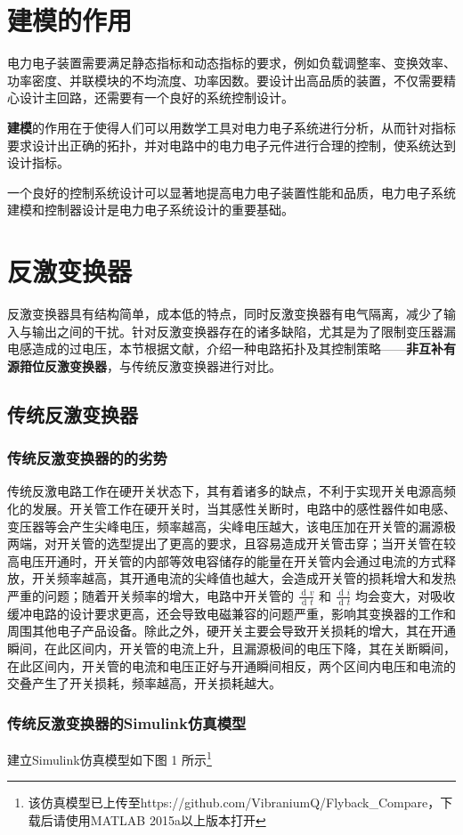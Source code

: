 \documentclass[UTF8]{ctexart}
\numberwithin{equation}{section}
\DeclareMathOperator{\dif}{d\!}
\begin{document}
	\section{建模的作用}
	电力电子装置需要满足静态指标和动态指标的要求，例如负载调整率、变换效率、功率密度、并联模块的不均流度、功率因数。要设计出高品质的装置，不仅需要精心设计主回路，还需要有一个良好的系统控制设计。
	
	\textbf{建模}的作用在于使得人们可以用数学工具对电力电子系统进行分析，从而针对指标要求设计出正确的拓扑，并对电路中的电力电子元件进行合理的控制，使系统达到设计指标。
	
	一个良好的控制系统设计可以显著地提高电力电子装置性能和品质，电力电子系统建模和控制器设计是电力电子系统设计的重要基础。
	\section{反激变换器}
	反激变换器具有结构简单，成本低的特点，同时反激变换器有电气隔离，减少了输入与输出之间的干扰。针对反激变换器存在的诸多缺陷，尤其是为了限制变压器漏电感造成的过电压，本节根据文献，介绍一种电路拓扑及其控制策略——\textbf{非互补有源箝位反激变换器}，与传统反激变换器进行对比。
	\subsection{传统反激变换器}
	\subsubsection{传统反激变换器的的劣势}
	传统反激电路工作在硬开关状态下，其有着诸多的缺点，不利于实现开关电源高频化的发展。开关管工作在硬开关时，当其感性关断时，电路中的感性器件如电感、变压器等会产生尖峰电压，频率越高，尖峰电压越大，该电压加在开关管的漏源极两端，对开关管的选型提出了更高的要求，且容易造成开关管击穿；当开关管在较高电压开通时，开关管的内部等效电容储存的能量在开关管内会通过电流的方式释放，开关频率越高，其开通电流的尖峰值也越大，会造成开关管的损耗增大和发热严重的问题；随着开关频率的增大，电路中开关管的 $\frac{\dif v}{\dif t}$ 和 $\frac{\dif i}{\dif t}$ 均会变大，对吸收缓冲电路的设计要求更高，还会导致电磁兼容的问题严重，影响其变换器的工作和周围其他电子产品设备。除此之外，硬开关主要会导致开关损耗的增大，其在开通瞬间，在此区间内，开关管的电流上升，且漏源极间的电压下降，其在关断瞬间，在此区间内，开关管的电流和电压正好与开通瞬间相反，两个区间内电压和电流的交叠产生了开关损耗，频率越高，开关损耗越大。
	
	\newpage
	\subsubsection{传统反激变换器的Simulink仿真模型}
	建立Simulink仿真模型如下图 1 所示\footnote{该仿真模型已上传至https://github.com/VibraniumQ/Flyback\_Compare，下载后请使用MATLAB 2015a以上版本打开}
	
\end{document}
